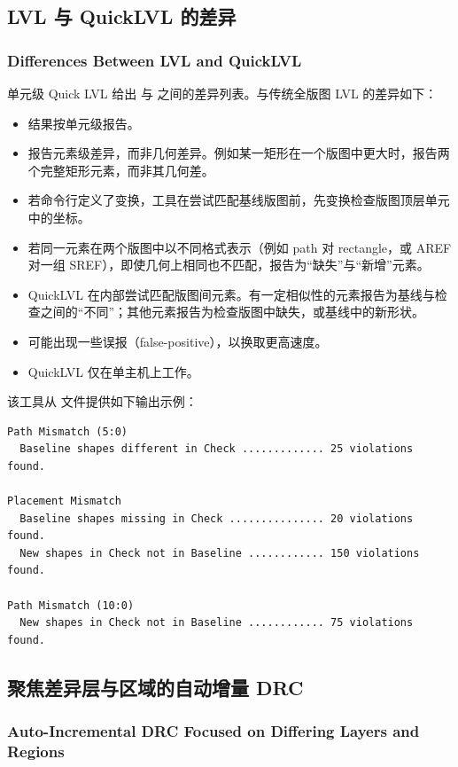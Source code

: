 \subsection{LVL 与 QuickLVL 的差异}
\subsubsection*{Differences Between LVL and QuickLVL}

单元级 Quick LVL 给出  与  之间的差异列表。与传统全版图 LVL 的差异如下：
\begin{itemize}
  \item 结果按单元级报告。
  \item 报告元素级差异，而非几何差异。例如某一矩形在一个版图中更大时，报告两个完整矩形元素，而非其几何差。
  \item 若命令行定义了变换，工具在尝试匹配基线版图前，先变换检查版图顶层单元中的坐标。
  \item 若同一元素在两个版图中以不同格式表示（例如 path 对 rectangle，或 AREF 对一组 SREF），即使几何上相同也不匹配，报告为“缺失”与“新增”元素。
  \item QuickLVL 在内部尝试匹配版图间元素。有一定相似性的元素报告为基线与检查之间的“不同”；其他元素报告为检查版图中缺失，或基线中的新形状。
  \item 可能出现一些误报（false-positive），以换取更高速度。
  \item QuickLVL 仅在单主机上工作。
\end{itemize}

该工具从  文件提供如下输出示例：
\begin{lstlisting}
Path Mismatch (5:0)
  Baseline shapes different in Check ............. 25 violations found.

Placement Mismatch
  Baseline shapes missing in Check ............... 20 violations found.
  New shapes in Check not in Baseline ............ 150 violations found.

Path Mismatch (10:0)
  New shapes in Check not in Baseline ............ 75 violations found.
\end{lstlisting}

\subsection{聚焦差异层与区域的自动增量 DRC}
\subsubsection*{Auto-Incremental DRC Focused on Differing Layers and Regions}


